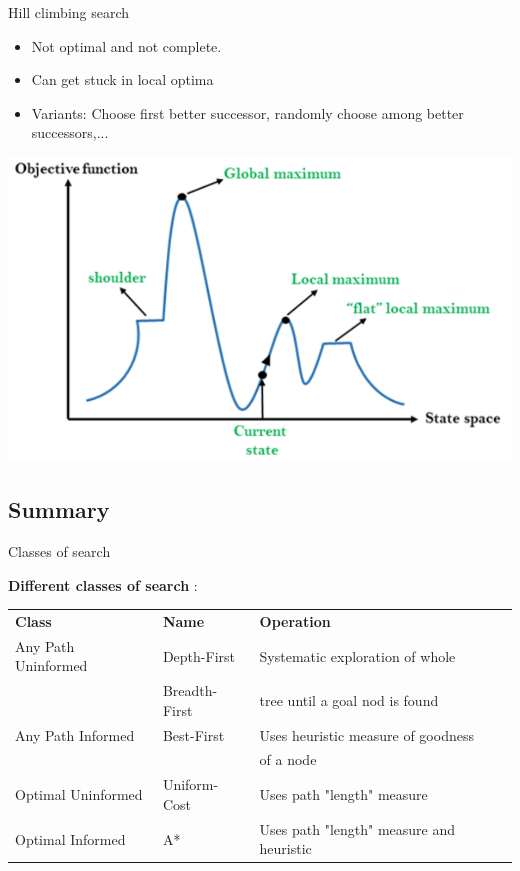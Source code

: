 \documentclass[9pt]{beamer}
\begin{document}
\begin{frame}{Hill climbing search}
\begin{small}

\begin{itemize}
    \item Not optimal and not complete.
    \item Can get stuck in local optima
    \item Variants: Choose first better successor, randomly choose among better successors,...
\end{itemize}

\begin{center}
    \includegraphics[keepaspectratio, width=0.75\linewidth]{images/local_optima.png}
\end{center}

\end{small}
\end{frame}

\subsection{Summary}

\begin{frame}{Classes of search}
\begin{small}

\textbf{Different classes of search} \cite{Russell2002}:

\begin{tabular}{l l l}
\textbf{Class} & \textbf{Name} & \textbf{Operation}\\
Any Path Uninformed & Depth-First & Systematic exploration of whole\\
                    & Breadth-First & tree until a goal nod is found\\
Any Path Informed & Best-First & Uses heuristic measure of goodness\\
                  &            & of a node\\
Optimal Uninformed & Uniform-Cost & Uses path "length" measure\\
Optimal Informed & A* & Uses path "length" measure and heuristic\\
\end{tabular}

\end{small}
\end{frame}
\end{document}
